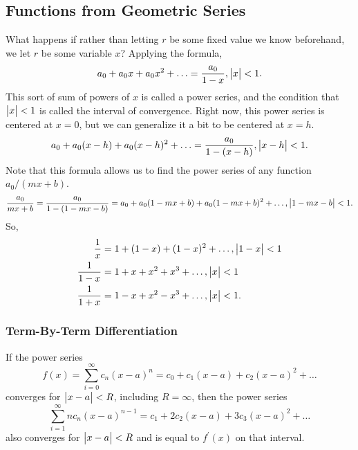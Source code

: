 \subsection{Functions from Geometric Series}
What happens if rather than letting $r$ be some fixed value we know beforehand, we let $r$ be some variable $x$?
Applying the formula,
\begin{equation*}
	a_0 + a_0x + a_0x^2 + \ldots = \frac{a_0}{1-x}, \big\lvert x \big\rvert < 1.
\end{equation*}
This sort of sum of powers of $x$ is called a power series, and the condition that $\big\lvert x \big\rvert<1$ is called the interval of convergence.
Right now, this power series is centered at $x=0$, but we can generalize it a bit to be centered at $x=h$.
\begin{equation*}
	a_0 + a_0(x-h) + a_0(x-h)^2 + \ldots = \frac{a_0}{1-(x-h)}, \big\lvert x-h \big\rvert < 1.
\end{equation*}
Note that this formula allows us to find the power series of any function $a_0/(mx+b)$.
\begin{equation*}
	\frac{a_0}{mx + b} = \frac{a_0}{1-(1-mx-b)} = a_0 + a_0(1-mx+b) + a_0(1-mx+b)^2 + \ldots, \big\lvert 1-mx-b \big\rvert < 1.
\end{equation*}
So,
\begin{align*}
	\frac{1}{x} &= 1 + (1-x) + (1-x)^2 + \ldots, \big\lvert 1-x \big\rvert < 1 \\
	\frac{1}{1-x} &= 1 + x + x^2 + x^3 + \ldots, \big\lvert x \big\rvert < 1 \\
	\frac{1}{1+x} &= 1 - x + x^2 - x^3 + \ldots, \big\lvert x \big\rvert < 1.
\end{align*}

\subsubsection{Term-By-Term Differentiation}
\begin{theorem}
	If the power series
	\begin{equation*}
		f(x) = \sum_{i=0}^{\infty}{c_n(x-a)^n} = c_0 + c_1(x-a) + c_2(x-a)^2 + \ldots
	\end{equation*}
	converges for $\big\lvert x-a \big\rvert < R$, including $R=\infty$, then the power series
	\begin{equation*}
		\sum_{i=1}^{\infty}{nc_n(x-a)^{n-1}} = c_1 + 2c_2(x-a) + 3c_3(x-a)^2 + \ldots
	\end{equation*}
	also converges for $\big\lvert x-a \big\rvert < R$ and is equal to $f^\prime(x)$ on that interval.
\end{theorem}

